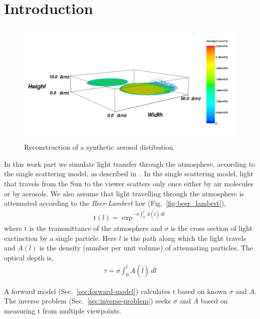 \documentclass[10pt,twocolumn,letterpaper]{article}
\newcommand{\derivsym}[1]{\,d{#1}}
\begin{document}
\section{Introduction}


\begin{figure}
  \centering
    \includegraphics[width=\columnwidth]{images/front.png}
    \caption{Reconstruction of a synthetic aerosol distibution.}
  \label{fig:front}
\end{figure}
In this work part we simulate light transfer through the atmosphere,
according to the single scattering model, as described
in~\cite{Levi1980}. In the single scattering model, light that travels
from the Sun to the viewer scatters only once either by air molecules
or by aerosols. We also assume that light travelling through the
atmosphere is attenuated according to the {\em Beer-Lambert} law
(Fig.~\ref{fig:beer_lambert}),
\begin{align}
  \mathrm{t}(l)=\exp^{-\sigma \int_{0}^l
    A(\acute{l})\derivsym{\acute{l}}}
  \label{eq:beer-lambert}
\end{align}
where $\mathrm{t}$ is the transmittance of the atmosphere and $\sigma$
is the cross section of light exctinction by a single particle. Here
$l$ is the path along which the light travels and $A(l)$ is the
density (number per unit volume) of attenuating particles. The optical
depth is,
\begin{align}
  \tau = \sigma \int_{0}^l A(\acute{l})\derivsym{\acute{l}}
  \label{eq:tau_definition}
\end{align}

A forward model (Sec.~\ref{sec:forward-model}) calculates $\mathrm{t}$
based on known $\sigma$ and $A$. The inverse problem
(Sec.~\ref{sec:inverse-problem}) seeks $\sigma$ and $A$ based on
measuring $\mathrm{t}$ from multiple viewpoints.
\end{document}
